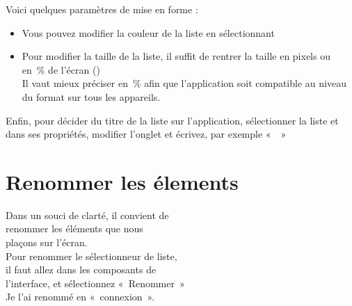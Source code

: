 

\begin{minipage}{.6\textwidth}%

Voici quelques paramètres de mise en forme : 

\begin{itemize}
    \item Vous pouvez modifier la couleur de la liste en sélectionnant 
    \item Pour modifier la taille de la liste, il suffit de 			rentrer la taille en pixels ou en \% de l'écran () \\	Il vaut mieux préciser en \% afin que l'application soit compatible au niveau du format sur tous les appareils.
\end{itemize}

\end{minipage}%
\hfill
\begin{minipage}{.35\textwidth}%
\end{minipage}%
\newline \newline 

Enfin, pour décider du titre de la liste sur l'application, sélectionner la liste  et dans ses {\color{green}propriétés}, modifier l'onglet  et écrivez, par exemple «  »


\section{Renommer les élements}


\begin{minipage}{.6\textwidth}%

Dans un souci de clarté, il convient de \\ renommer les éléments que nous \\ plaçons sur l'écran. \\

Pour renommer le sélectionneur de liste,\\ il faut allez dans les {\color{gray}composants} de \\l'interface,  et sélectionnez  « Renommer » \\
Je l'ai renommé en « connexion ».

\end{minipage}%
\hfill
\begin{minipage}{.35\textwidth}%
\end{minipage}%


